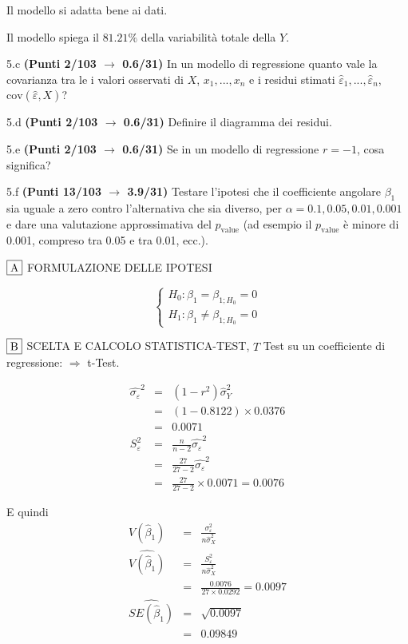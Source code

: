 \documentclass[
  11pt,
]{book}
\theoremstyle{mytheoremstyle}
\theoremstyle{mydefstyle}
\begin{document}
Il modello si adatta bene ai dati.

Il modello spiega il \(81.21\%\) della variabilità totale della \(Y\).

5.c \textbf{(Punti 2/103 \(\rightarrow\) 0.6/31)} In un modello di regressione quanto vale la covarianza tra le i valori osservati di \(X\), \(x_1,...,x_n\) e i residui stimati \(\hat\varepsilon_1,...,\hat\varepsilon_n\), \(\text{cov}(\hat\varepsilon,X)\)?

5.d \textbf{(Punti 2/103 \(\rightarrow\) 0.6/31)} Definire il diagramma dei residui.

5.e \textbf{(Punti 2/103 \(\rightarrow\) 0.6/31)} Se in un modello di regressione \(r=-1\), cosa significa?

5.f \textbf{(Punti 13/103 \(\rightarrow\) 3.9/31)} Testare l'ipotesi che il coefficiente angolare \(\beta_1\) sia uguale a zero contro l'alternativa che sia diverso, per \(\alpha=0.1,0.05,0.01,0.001\) e dare una valutazione approssimativa del \(p_\text{value}\) (ad esempio il \(p_\text{value}\) è minore di 0.001, compreso tra 0.05 e tra 0.01, ecc.).

\(\fbox{A}\) FORMULAZIONE DELLE IPOTESI

\[\begin{cases}
   H_0: \beta_1 = \beta_{1;H_0}=0 \\
   H_1: \beta_1 \neq \beta_{1;H_0}=0 
   \end{cases}\]

\(\fbox{B}\) SCELTA E CALCOLO STATISTICA-TEST, \(T\)
Test su un coefficiente di regressione: \(\Rightarrow\) t-Test.

\begin{eqnarray*}
\hat{\sigma_\varepsilon}^2&=&(1-r^2)\hat\sigma_Y^2\\
&=& (1- 0.8122 )\times 0.0376 \\
   &=&  0.0071 \\
   S_\varepsilon^2 &=& \frac{n} {n-2} \hat{\sigma_\varepsilon}^2\\
   &=&  \frac{ 27 } { 27 -2} \hat{\sigma_\varepsilon}^2 \\
 &=&  \frac{ 27 } { 27 -2} \times  0.0071  =  0.0076  
\end{eqnarray*}

E quindi\begin{eqnarray*}
V(\hat\beta_{1}) &=& \frac{\sigma_{\varepsilon}^{2}} {n \hat{\sigma}^{2}_{X}} \\
\widehat{V(\hat\beta_{1})} &=& \frac{S_{\varepsilon}^{2}} {n \hat{\sigma}^{2}_{X}} \\
 &=& \frac{ 0.0076 } { 27 \times  0.0292 } =  0.0097 \\
 \widehat{SE(\hat\beta_{1})}        &=&  \sqrt{ 0.0097 }\\
 &=&  0.09849 
\end{eqnarray*}
\end{document}
